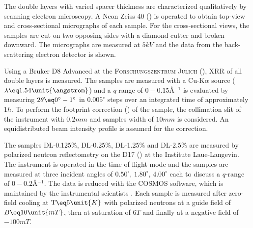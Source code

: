 \documentclass[\main/dresen_thesis.tex]{subfiles}
\begin{document}
    The double layers with varied spacer thickness are characterized qualitatively by scanning electron microscopy.
    A Neon Zeiss 40 () is operated to obtain top-view and cross-sectional micrographs of each sample.
    For the cross-sectional views, the samples are cut on two opposing sides with a diamond cutter and broken downward.
    The micrographs are measured at $5 \unit{kV}$ and the data from the back-scattering electron detector is shown.

    Using a Bruker D8 Advanced at the \textsc{Forschungszentrum J\"ulich} (), XRR of all double layers is measured.
    The samples are measured with a Cu-K$\alpha$ source ($\lambda \eq 1.54 \unit{\angstrom}$) and a $q$-range of $0 - 0.15 \unit{\angstrom^{-1}}$ is evaluated by measuring $2 \theta \eq 0^\circ - 1 ^\circ$ in $0.005 ^\circ$ steps over an integrated time of approximately $1 \unit{h}$.
    To perform the footprint correction () of the sample, the collimation slit of the instrument with $0.2 \unit{mm}$ and samples width of $10 \unit{mm}$ is considered.
    An equidistributed beam intensity profile is assumed for the correction.

    The samples DL-0.125\%, DL-0.25\%, DL-1.25\% and DL-2.5\% are measured by polarized neutron reflectometry on the D17 () at the Institute Laue-Langevin.
    The instrument is operated in the time-of-flight mode and the samples are measured at three incident angles of $0.50^\circ ,\, 1.80^\circ ,\, 4.00^\circ$ each to discuss a $q$-range of $0 - 0.2 \unit{\angstrom^{-1}}$.
    The data is reduced with the COSMOS software, which is maintained by the instrumental scientists \cite{Gutfreund_2018_Towar}.
    Each sample is measured after zero-field cooling at $\mathrm{T} \eq 5 \unit{K}$ with polarized neutrons at a guide field of $B \eq 10 \unit{mT}$, then at saturation of $6 \unit{T}$ and finally at a negative field of $-100 \unit{mT}$.
\end{document}
